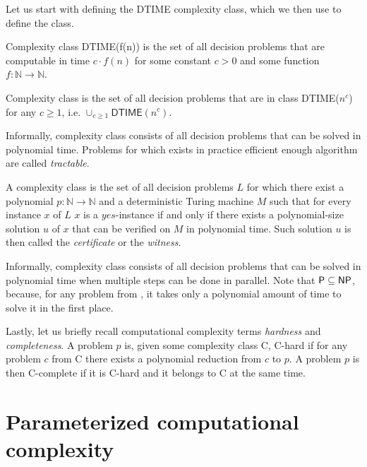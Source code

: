 Let us start with defining the \textsf{DTIME} complexity class, which we then use to define the \Po class.

\begin{definition}
    Complexity class \textsf{DTIME}(f(n)) is the set of all decision problems that are computable in time
    $c \cdot f(n)$ for some constant $c > 0$ and some function $f \colon \mathbb{N} \rightarrow \mathbb{N}$.
\end{definition}

\begin{definition}[\Po]
    Complexity class \Po is the set of all decision problems that are in class \textsf{DTIME}($n^c$)
    for any $c \geq 1$, i.e.
    $\cup_{c \geq 1} \textsf{DTIME}(n^c)$.
\end{definition}

Informally, complexity class \Po consists of all decision problems that can be solved in polynomial time.
Problems for which exists in practice efficient enough algorithm are called \emph{tractable}.

\begin{definition}[\NP]
    A complexity class \NP is the set of all decision problems $L$ for which there exist
    a polynomial $p \colon \mathbb{N} \rightarrow \mathbb{N}$ and a deterministic Turing machine $M$
    such that for every instance $x$ of $L$ $x$ is a $yes$-instance if and only if there exists
    a polynomial-size solution $u$ of $x$ that can be verified on $M$ in polynomial time.
    Such solution $u$ is then called the \emph{certificate} or the \emph{witness}.
\end{definition}

Informally, complexity class \NP consists of all decision problems that can be solved in polynomial time
when multiple steps can be done in parallel.
Note that $\textsf{P} \subseteq \textsf{NP}$, because, for any problem from \Po, it takes only a polynomial amount of time to solve
it in the first place.

Lastly, let us briefly recall computational complexity terms \emph{hardness} and \emph{completeness}.
A problem $p$ is, given some complexity class \textsf{C}, \textsf{C-hard} if for any problem $c$ from \textsf{C}
there exists a polynomial reduction from $c$ to $p$.
A problem $p$ is then \textsf{C-complete} if it is \textsf{C-hard} and it belongs to \textsf{C} at the same time.


\section{Parameterized computational complexity}\label{section:ParamComp}

